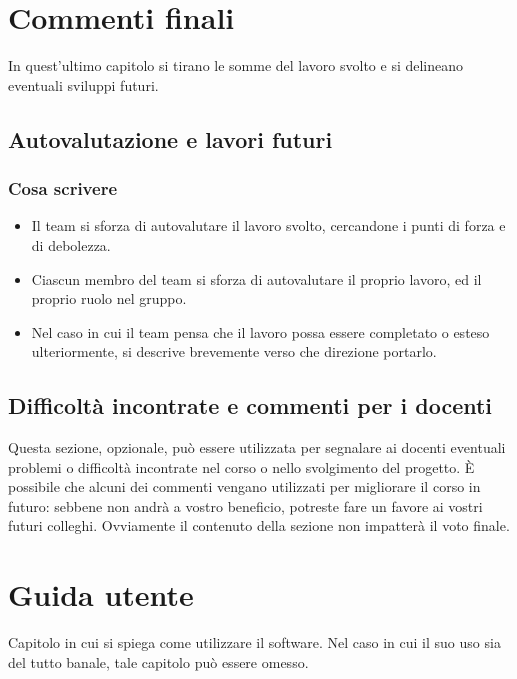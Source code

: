 \documentclass[a4paper,12pt]{report}
\begin{document}
\chapter{Commenti finali}

In quest'ultimo capitolo si tirano le somme del lavoro svolto e si delineano eventuali sviluppi futuri.

\section{Autovalutazione e lavori futuri}

\subsection*{Cosa scrivere}

\begin{itemize}
 \item Il team si sforza di autovalutare il lavoro svolto, cercandone i punti di forza e di debolezza.
 \item Ciascun membro del team si sforza di autovalutare il proprio lavoro, ed il proprio ruolo nel gruppo.
 \item Nel caso in cui il team pensa che il lavoro possa essere completato o esteso ulteriormente, si descrive brevemente verso che direzione portarlo.
\end{itemize}

\section{Difficoltà incontrate e commenti per i docenti}

Questa sezione, opzionale, può essere utilizzata per segnalare ai docenti eventuali problemi o difficoltà incontrate nel corso o nello svolgimento del progetto.
%
È possibile che alcuni dei commenti vengano utilizzati per migliorare il corso in futuro: sebbene non andrà a vostro beneficio, potreste fare un favore ai vostri futuri colleghi.
%
Ovviamente il contenuto della sezione non impatterà il voto finale.

\appendix
\chapter{Guida utente}

Capitolo in cui si spiega come utilizzare il software. Nel caso in cui il suo uso sia del tutto banale, tale capitolo può essere omesso.
\end{document}
